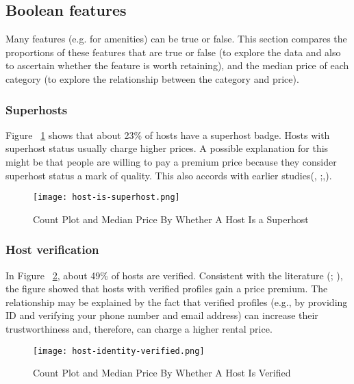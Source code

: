 \subsection{Boolean features}
\label{sec:boolean_features}

Many features (e.g. for amenities) can be true or false. This section compares
the proportions of these features that are true or false (to explore the data
and also to ascertain whether the feature is worth retaining), and the median
price of each category (to explore the relationship between the category and
price).

\subsubsection*{Superhosts}

Figure ~\ref{fig:host_is_superhost} shows that about 23\% of hosts have a
superhost badge. Hosts with superhost status usually charge higher prices. A
possible explanation for this might be that people are willing to pay a premium
price because they consider superhost status a mark of quality.  This also
accords with earlier studies(\cite{gibbs2018use},
\cite{kakar2016effects};\cite{wang2017price},\cite{cai2019price}).

\begin{figure}[!htbp]\centering
    \texttt{[image: host-is-superhost.png]}
    \caption{Count Plot and Median Price By Whether A Host Is a Superhost}
    \label{fig:host_is_superhost}
\end{figure}

\subsubsection*{Host verification}
In Figure ~\ref{fig:host_identity_verified}, about 49\% of hosts are verified.
Consistent with the literature (\cite{chen2017consumer}; \cite{wang2017price}),
the figure showed that hosts with verified profiles gain a price premium. The
relationship may be explained by the fact that verified profiles (e.g., by
providing ID and verifying your phone number and email address)  can increase
their trustworthiness and, therefore, can charge a higher rental price.

\begin{figure}[!htbp]\centering
    \texttt{[image: host-identity-verified.png]}
    \caption{Count Plot and Median Price By Whether A Host Is Verified}
    \label{fig:host_identity_verified}
\end{figure}

